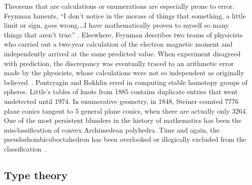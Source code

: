 \documentclass{llncs}
\begin{document}

Theorems that are calculations or enumerations are especially prone to
error.  Feynman laments, ``I don't notice in the morass of things that something, a
little limit or sign, goes wrong.\dots I have mathematically proven to myself
so many things that aren't true.''
\cite[p.~885]{FeCo}. Elsewhere, Feynman describes two teams of
physicists who carried out a two-year calculation of the electron
magnetic moment and independently arrived at the same predicted value.
When experiment disagreed with prediction, the discrepancy
was eventually traced to an arithmetic error made by the physicists,
whose calculations were not so independent as originally
believed~\cite[p.~117]{FQED}.  Pontryagin and Rokhlin erred in computing stable
homotopy groups of spheres.  Little's tables of knots from 1885
contains duplicate entries that went undetected until 1974.  In
enumerative geometry, in 1848, Steiner counted $7776$ plane conics
tangent to $5$ general plane conics, when there are actually only
$3264$.  One of the most persistent blunders in the history of mathematics
has been the misclassification of convex Archimedean polyhedra.  Time and again,
the pseudorhombicuboctahedron has been overlooked or illogically excluded from
the classification~\cite{Gr11}.










\subsection{Type theory}
\end{document}
